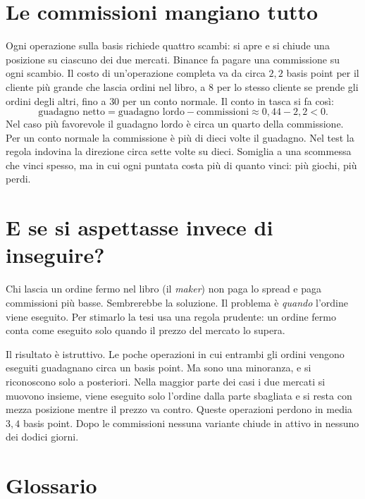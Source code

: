 \documentclass[a4paper,11pt]{article}
\begin{document}
\section*{Le commissioni mangiano tutto}

Ogni operazione sulla basis richiede quattro scambi: si apre e si chiude una posizione su ciascuno dei due mercati. Binance fa pagare una commissione su ogni scambio. Il costo di un'operazione completa va da circa $2{,}2$ basis point per il cliente più grande che lascia ordini nel libro, a $8$ per lo stesso cliente se prende gli ordini degli altri, fino a $30$ per un conto normale. Il conto in tasca si fa così:
\[
\text{guadagno netto} = \text{guadagno lordo} - \text{commissioni} \approx 0{,}44 - 2{,}2 < 0 .
\]
Nel caso più favorevole il guadagno lordo è circa un quarto della commissione. Per un conto normale la commissione è più di dieci volte il guadagno. Nel test la regola indovina la direzione circa sette volte su dieci. Somiglia a una scommessa che vinci spesso, ma in cui ogni puntata costa più di quanto vinci: più giochi, più perdi.

\section*{E se si aspettasse invece di inseguire?}

Chi lascia un ordine fermo nel libro (il \emph{maker}) non paga lo spread e paga commissioni più basse. Sembrerebbe la soluzione. Il problema è \emph{quando} l'ordine viene eseguito. Per stimarlo la tesi usa una regola prudente: un ordine fermo conta come eseguito solo quando il prezzo del mercato lo supera.

Il risultato è istruttivo. Le poche operazioni in cui entrambi gli ordini vengono eseguiti guadagnano circa un basis point. Ma sono una minoranza, e si riconoscono solo a posteriori. Nella maggior parte dei casi i due mercati si muovono insieme, viene eseguito solo l'ordine dalla parte sbagliata e si resta con mezza posizione mentre il prezzo va contro. Queste operazioni perdono in media $3{,}4$ basis point. Dopo le commissioni nessuna variante chiude in attivo in nessuno dei dodici giorni.

\section*{Glossario}
\end{document}
